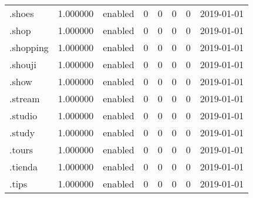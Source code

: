 \begin{tabular}{lrlrrrrl}
.shoes                    &          1.000000 &         enabled &                           0 &                           0 &                           0 &                   0 &           2019-01-01 \\
.shop                     &          1.000000 &         enabled &                           0 &                           0 &                           0 &                   0 &           2019-01-01 \\
.shopping                 &          1.000000 &         enabled &                           0 &                           0 &                           0 &                   0 &           2019-01-01 \\
.shouji                   &          1.000000 &         enabled &                           0 &                           0 &                           0 &                   0 &           2019-01-01 \\
.show                     &          1.000000 &         enabled &                           0 &                           0 &                           0 &                   0 &           2019-01-01 \\
.stream                   &          1.000000 &         enabled &                           0 &                           0 &                           0 &                   0 &           2019-01-01 \\
.studio                   &          1.000000 &         enabled &                           0 &                           0 &                           0 &                   0 &           2019-01-01 \\
.study                    &          1.000000 &         enabled &                           0 &                           0 &                           0 &                   0 &           2019-01-01 \\
.tours                    &          1.000000 &         enabled &                           0 &                           0 &                           0 &                   0 &           2019-01-01 \\
.tienda                   &          1.000000 &         enabled &                           0 &                           0 &                           0 &                   0 &           2019-01-01 \\
.tips                     &          1.000000 &         enabled &                           0 &                           0 &                           0 &                   0 &           2019-01-01 \\

\end{tabular}
